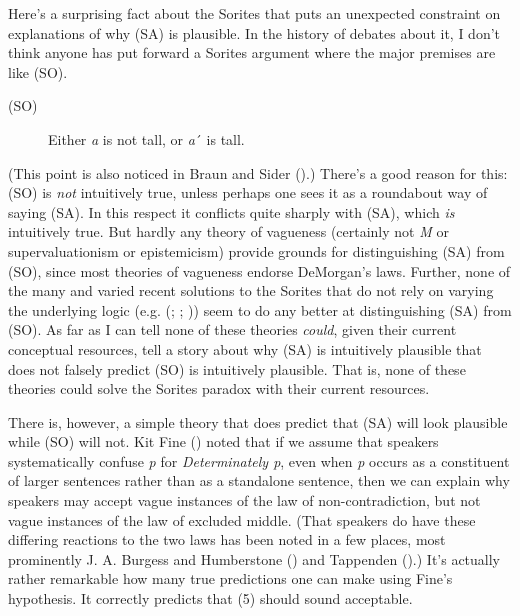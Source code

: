 \documentclass[
  11pt,
  letterpaper,
  DIV=11,
  numbers=noendperiod,
  twoside]{scrartcl}
\begin{document}
Here's a surprising fact about the Sorites that puts an unexpected
constraint on explanations of why (SA) is plausible. In the history of
debates about it, I don't think anyone has put forward a Sorites
argument where the major premises are like (SO).

\begin{description}
\item[(SO)]
Either \emph{a} is not tall, or \emph{a}´ is tall.
\end{description}

(This point is also noticed in Braun and Sider
().) There's a good reason for this: (SO)
is \emph{not} intuitively true, unless perhaps one sees it as a
roundabout way of saying (SA). In this respect it conflicts quite
sharply with (SA), which \emph{is} intuitively true. But hardly any
theory of vagueness (certainly not \emph{M} or supervaluationism or
epistemicism) provide grounds for distinguishing (SA) from (SO), since
most theories of vagueness endorse DeMorgan's laws. Further, none of the
many and varied recent solutions to the Sorites that do not rely on
varying the underlying logic (e.g. (;
;
)) seem to do any better at
distinguishing (SA) from (SO). As far as I can tell none of these
theories \emph{could}, given their current conceptual resources, tell a
story about why (SA) is intuitively plausible that does not falsely
predict (SO) is intuitively plausible. That is, none of these theories
could solve the Sorites paradox with their current resources.

There is, however, a simple theory that does predict that (SA) will look
plausible while (SO) will not. Kit Fine ()
noted that if we assume that speakers systematically confuse \emph{p}
for \emph{Determinately p}, even when \emph{p} occurs as a constituent
of larger sentences rather than as a standalone sentence, then we can
explain why speakers may accept vague instances of the law of
non-contradiction, but not vague instances of the law of excluded
middle. (That speakers do have these differing reactions to the two laws
has been noted in a few places, most prominently J. A. Burgess and
Humberstone () and Tappenden
().) It's actually rather remarkable
how many true predictions one can make using Fine's hypothesis. It
correctly predicts that (5) should sound acceptable.
\end{document}
